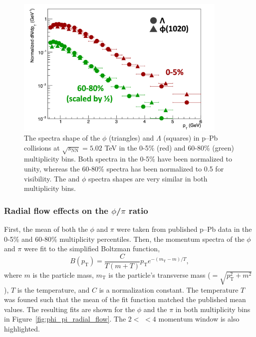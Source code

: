 \begin{figure}
    \centering
    \includegraphics[width=0.9\textwidth]{figures/analysis/lambda_phi_pt_comp.png}
    \caption{The \pt spectra shape of the $\phi$ (triangles) and $\Lambda$ (squares) in p--Pb collisions at $\sqrt{s_{\text{NN}}} = 5.02$ TeV in the 0-5\% (red) and 60-80\% (green) multiplicity bins. Both spectra in the 0-5\% have been normalized to unity, whereas the 60-80\% spectra has been normalized to 0.5 for visibility. The \lmb and $\phi$ spectra shapes are very similar in both multiplicity bins.}
    \label{fig:phi_lambda_pt}
\end{figure}

\subsubsection{Radial flow effects on the $\phi$/$\pi$ ratio}

First, the mean \pt of both the $\phi$ and $\pi$ were taken from published p--Pb data in the 0-5\% and 60-80\% multiplicity percentiles. Then, the momentum spectra of the $\phi$ and $\pi$ were fit to the simplified Boltzman function,
%
\begin{equation}
    \label{eq:boltz_eq}
    B\left(p_{\mathrm{T}}\right)=\frac{C}{T(m+T)} p_{\mathrm{T}}e^{-\left(m_{\mathrm{T}}-m\right) / T },
\end{equation}
where $m$ is the particle mass, $m_{\text{T}}$ is the particle's transverse mass ($= \sqrt{p_{\mathrm{T}}^{2}+m^{2}}$), $T$ is the temperature, and $C$ is a normalization constant. The temperature $T$ was founed such that the mean \pt of the fit function matched the published mean \pt values. The resulting fits are shown for the $\phi$ and the $\pi$ in both multiplicity bins in Figure~\ref{fig:phi_pi_radial_flow}. The $2 <$ \pt $< 4$ \GeVc momentum window is also highlighted.

